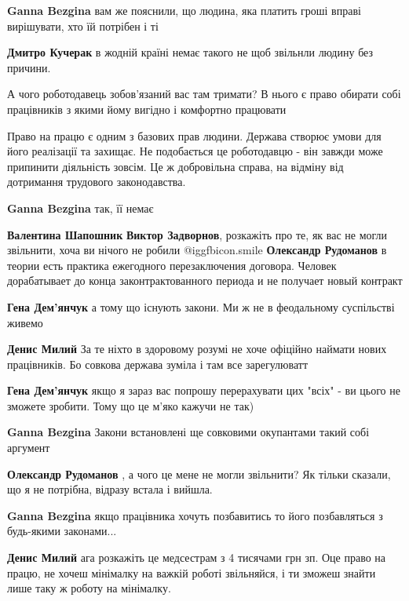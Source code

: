 \begin{itemize}
\begin{itemize}
\textbf{Ganna Bezgina} вам же пояснили, що людина, яка платить гроші вправі вирішувати, хто їй потрібен і ті

\textbf{Дмитро Кучерак} в жодній країні немає такого не щоб звільнли людину без причини.

А чого роботодавець зобов'язаний вас там тримати? В нього є право обирати собі працівників з якими йому вигідно і комфортно працювати


Право на працю є одним з базових прав людини. Держава створює умови для його
реалізації та захищає. Не подобається це роботодавцю - він завжди може
припинити діяльність зовсім. Це ж добровільна справа, на відміну від дотримання
трудового законодавства.


\textbf{Ganna Bezgina} так, її немає


\textbf{Валентина Шапошник} \textbf{Виктор Задворнов}, розкажіть про те, як вас не могли звільнити, хоча ви нічого не робили  @igg{fbicon.smile} 
\textbf{Олександр Рудоманов} в теории есть практика ежегодного перезаключения договора. Человек дорабатывает до конца законтрактованного периода и не получает новый контракт

\textbf{Гена Дем'янчук} а тому що існують закони. Ми ж не в феодальному суспільстві живемо

\textbf{Денис Милий} За те ніхто в здоровому розумі не хоче офіційно наймати нових працівників. Бо совкова держава зуміла і там все зарегулюватт

\textbf{Гена Дем'янчук} якщо я зараз вас попрошу перерахувати цих "всіх" - ви цього не зможете зробити. Тому що це м'яко кажучи не так)

\textbf{Ganna Bezgina} Закони встановлені ще совковими окупантами такий собі аргумент

\textbf{Олександр Рудоманов} , а чого це мене не могли звільнити? Як тільки сказали, що я не потрібна, відразу встала і вийшла.

\textbf{Ganna Bezgina} якщо працівника хочуть позбавитись то його позбавляться з будь-якими законами...

\textbf{Денис Милий} ага розкажіть це медсестрам з 4 тисячами грн зп. Оце право на працю, не хочеш мінімалку на важкій роботі звільняйся, і ти зможеш знайти лише таку ж роботу на мінімалку.


\end{itemize}
\end{itemize}
